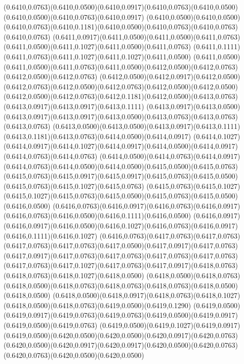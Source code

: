 (0.6410,0.0763)(0.6410,0.0500)(0.6410,0.0917)(0.6410,0.0763)(0.6410,0.0500)(0.6410,0.0500)(0.6410,0.0763)(0.6410,0.0917)
(0.6410,0.0500)(0.6410,0.0500)(0.6410,0.0763)(0.6410,0.1181)(0.6410,0.0500)(0.6410,0.0763)(0.6410,0.0763)(0.6410,0.0763)
(0.6411,0.0917)(0.6411,0.0500)(0.6411,0.0500)(0.6411,0.0763)(0.6411,0.0500)(0.6411,0.1027)(0.6411,0.0500)(0.6411,0.0763)
(0.6411,0.1111)(0.6411,0.0763)(0.6411,0.1027)(0.6411,0.1027)(0.6411,0.0500)
\PST@Solid(0.6411,0.0500)(0.6411,0.0500)(0.6411,0.0763)(0.6411,0.0500)(0.6412,0.0500)(0.6412,0.0763)(0.6412,0.0500)(0.6412,0.0763)
(0.6412,0.0500)(0.6412,0.0917)(0.6412,0.0500)(0.6412,0.0763)(0.6412,0.0500)(0.6412,0.0763)(0.6412,0.0500)(0.6412,0.0500)
(0.6412,0.0500)(0.6412,0.0763)(0.6412,0.1181)(0.6412,0.0500)(0.6413,0.0763)(0.6413,0.0917)(0.6413,0.0917)(0.6413,0.1111)
(0.6413,0.0917)(0.6413,0.0500)(0.6413,0.0917)(0.6413,0.0917)(0.6413,0.0500)(0.6413,0.0763)(0.6413,0.0763)(0.6413,0.0763)
(0.6413,0.0500)(0.6413,0.0500)(0.6413,0.0917)(0.6413,0.1111)(0.6413,0.1181)(0.6413,0.0763)(0.6414,0.0500)(0.6414,0.0917)
(0.6414,0.1027)(0.6414,0.0917)(0.6414,0.1027)(0.6414,0.0917)(0.6414,0.0500)(0.6414,0.0917)(0.6414,0.0763)(0.6414,0.0763)
(0.6414,0.0500)(0.6414,0.0763)(0.6414,0.0917)(0.6414,0.0763)(0.6414,0.0500)(0.6414,0.0500)(0.6415,0.0500)(0.6415,0.0763)
(0.6415,0.0763)(0.6415,0.0917)(0.6415,0.0917)(0.6415,0.0763)(0.6415,0.0500)(0.6415,0.0763)(0.6415,0.1027)(0.6415,0.0763)
(0.6415,0.0763)(0.6415,0.1027)(0.6415,0.1027)(0.6415,0.0763)(0.6415,0.0500)(0.6415,0.0763)(0.6415,0.0500)(0.6416,0.0500)
(0.6416,0.0763)(0.6416,0.0917)(0.6416,0.0763)(0.6416,0.0917)(0.6416,0.0763)(0.6416,0.0500)(0.6416,0.1111)(0.6416,0.0500)
(0.6416,0.0917)(0.6416,0.0917)(0.6416,0.0500)(0.6416,0.1027)(0.6416,0.0763)(0.6416,0.0917)(0.6416,0.1111)(0.6416,0.1027)
(0.6416,0.0763)(0.6417,0.0763)(0.6417,0.0763)(0.6417,0.0763)(0.6417,0.0763)(0.6417,0.0500)(0.6417,0.0917)(0.6417,0.0763)
(0.6417,0.0917)(0.6417,0.0763)(0.6417,0.0763)(0.6417,0.0763)(0.6417,0.0763)
\PST@Solid(0.6417,0.0763)(0.6417,0.1027)(0.6417,0.0763)(0.6417,0.0917)(0.6418,0.0763)(0.6418,0.0763)(0.6418,0.1027)(0.6418,0.0500)
(0.6418,0.0500)(0.6418,0.0763)(0.6418,0.0500)(0.6418,0.0763)(0.6418,0.0763)(0.6418,0.0763)(0.6418,0.0500)(0.6418,0.0500)
(0.6418,0.0500)(0.6418,0.0917)(0.6418,0.0763)(0.6418,0.1027)(0.6418,0.0500)(0.6418,0.0763)(0.6419,0.0500)(0.6419,0.1290)
(0.6419,0.0500)(0.6419,0.0917)(0.6419,0.0763)(0.6419,0.0763)(0.6419,0.0500)(0.6419,0.0917)(0.6419,0.0500)(0.6419,0.0763)
(0.6419,0.0500)(0.6419,0.1027)(0.6419,0.0917)(0.6419,0.0500)(0.6420,0.0500)(0.6420,0.0500)(0.6420,0.0917)(0.6420,0.0763)
(0.6420,0.0500)(0.6420,0.0917)(0.6420,0.0917)(0.6420,0.0500)(0.6420,0.0763)(0.6420,0.0763)(0.6420,0.0500)(0.6420,0.0500)

